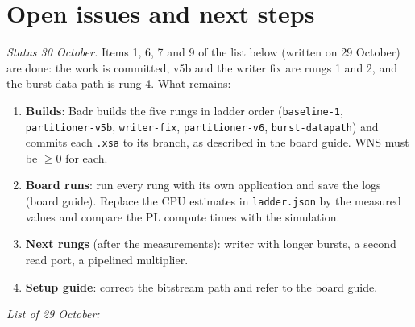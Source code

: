 \documentclass[11pt,a4paper]{article}
\newcommand{\code}[1]{\texttt{#1}}
\begin{document}
\section{Open issues and next steps}
\emph{Status 30 October.} Items 1, 6, 7 and 9 of the list below (written on 29 October) are done: the work is committed, v5b and the writer fix are rungs 1 and 2, and the burst data path is rung 4. What remains:
\begin{enumerate}[noitemsep]
  \item \textbf{Builds}: Badr builds the five rungs in ladder order (\code{baseline-1}, \code{partitioner-v5b}, \code{writer-fix}, \code{partitioner-v6}, \code{burst-datapath}) and commits each \code{.xsa} to its branch, as described in the board guide. WNS must be $\geq 0$ for each.
  \item \textbf{Board runs}: run every rung with its own application and save the logs (board guide). Replace the CPU estimates in \code{ladder.json} by the measured values and compare the PL compute times with the simulation.
  \item \textbf{Next rungs} (after the measurements): writer with longer bursts, a second read port, a pipelined multiplier.
  \item \textbf{Setup guide}: correct the bitstream path and refer to the board guide.
\end{enumerate}
\emph{List of 29 October:}
\end{document}
